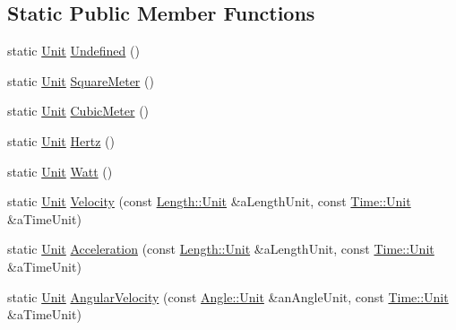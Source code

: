 \subsection*{Static Public Member Functions}
\begin{DoxyCompactItemize}
\item 
static \hyperlink{classlibrary_1_1physics_1_1units_1_1_derived_1_1_unit}{Unit} \hyperlink{classlibrary_1_1physics_1_1units_1_1_derived_1_1_unit_a0bd6544fb76067c5efc24b794e764301}{Undefined} ()
\item 
static \hyperlink{classlibrary_1_1physics_1_1units_1_1_derived_1_1_unit}{Unit} \hyperlink{classlibrary_1_1physics_1_1units_1_1_derived_1_1_unit_a5d30231014ef972169cca87c852cfee3}{Square\+Meter} ()
\item 
static \hyperlink{classlibrary_1_1physics_1_1units_1_1_derived_1_1_unit}{Unit} \hyperlink{classlibrary_1_1physics_1_1units_1_1_derived_1_1_unit_ad8e71820dabe4073b90ae3681f31b420}{Cubic\+Meter} ()
\item 
static \hyperlink{classlibrary_1_1physics_1_1units_1_1_derived_1_1_unit}{Unit} \hyperlink{classlibrary_1_1physics_1_1units_1_1_derived_1_1_unit_a3eb18a6cc5208068ea633533edddf0d3}{Hertz} ()
\item 
static \hyperlink{classlibrary_1_1physics_1_1units_1_1_derived_1_1_unit}{Unit} \hyperlink{classlibrary_1_1physics_1_1units_1_1_derived_1_1_unit_a242bb2e90f24200686e272312a2b05a9}{Watt} ()
\item 
static \hyperlink{classlibrary_1_1physics_1_1units_1_1_derived_1_1_unit}{Unit} \hyperlink{classlibrary_1_1physics_1_1units_1_1_derived_1_1_unit_a14a4c4646fc7af71b1b295039526c7a1}{Velocity} (const \hyperlink{classlibrary_1_1physics_1_1units_1_1_length_a3b8b39cd245cf6b19dc34459baeccb18}{Length\+::\+Unit} \&a\+Length\+Unit, const \hyperlink{classlibrary_1_1physics_1_1units_1_1_time_ab876a6a05c9a2f28905f2753bfd64109}{Time\+::\+Unit} \&a\+Time\+Unit)
\item 
static \hyperlink{classlibrary_1_1physics_1_1units_1_1_derived_1_1_unit}{Unit} \hyperlink{classlibrary_1_1physics_1_1units_1_1_derived_1_1_unit_a0371d4157e5b4995c54989bb471f4a12}{Acceleration} (const \hyperlink{classlibrary_1_1physics_1_1units_1_1_length_a3b8b39cd245cf6b19dc34459baeccb18}{Length\+::\+Unit} \&a\+Length\+Unit, const \hyperlink{classlibrary_1_1physics_1_1units_1_1_time_ab876a6a05c9a2f28905f2753bfd64109}{Time\+::\+Unit} \&a\+Time\+Unit)
\item 
static \hyperlink{classlibrary_1_1physics_1_1units_1_1_derived_1_1_unit}{Unit} \hyperlink{classlibrary_1_1physics_1_1units_1_1_derived_1_1_unit_addd355a633d2d5addd72efdd7cfebc65}{Angular\+Velocity} (const \hyperlink{classlibrary_1_1physics_1_1units_1_1_angle_a3c329d415a61783b16ce481874cc5956}{Angle\+::\+Unit} \&an\+Angle\+Unit, const \hyperlink{classlibrary_1_1physics_1_1units_1_1_time_ab876a6a05c9a2f28905f2753bfd64109}{Time\+::\+Unit} \&a\+Time\+Unit)

\end{DoxyCompactItemize}
